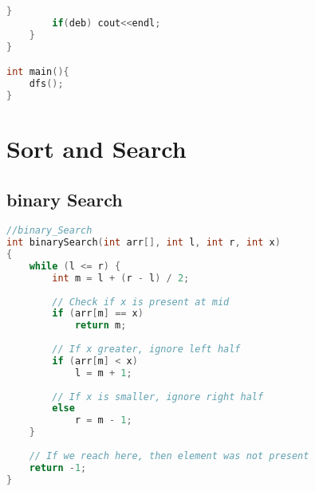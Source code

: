\documentclass{article}
\begin{document}
\begin{multicols}{2}
\begin{lstlisting}[linewidth=\columnwidth,breaklines=true,language=C++]
        }
        if(deb) cout<<endl;
    }
}

int main(){
    dfs();
}
\end{lstlisting}
\section{Sort and Search}
\subsection{binary Search}
\begin{lstlisting}[linewidth=\columnwidth,breaklines=true,language=C++]
//binary_Search
int binarySearch(int arr[], int l, int r, int x)
{
    while (l <= r) {
        int m = l + (r - l) / 2;
 
        // Check if x is present at mid
        if (arr[m] == x)
            return m;
 
        // If x greater, ignore left half
        if (arr[m] < x)
            l = m + 1;
 
        // If x is smaller, ignore right half
        else
            r = m - 1;
    }
 
    // If we reach here, then element was not present
    return -1;
}
 \end{lstlisting}
\end{multicols}
\end{document}
